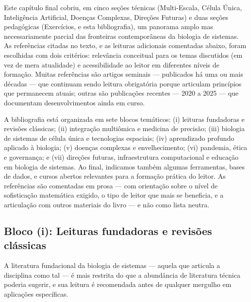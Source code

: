 {Este capítulo final cobriu, em cinco seções técnicas (Multi-Escala, Célula Única, Inteligência Artificial, Doenças Complexas, Direções Futuras) e duas seções pedagógicas (Exercícios, e esta bibliografia), um panorama amplo mas necessariamente parcial das fronteiras contemporâneas da biologia de sistemas. As referências citadas no texto, e as leituras adicionais comentadas abaixo, foram escolhidas com dois critérios: relevância conceitual para os temas discutidos (em vez de mera atualidade) e acessibilidade ao leitor em diferentes níveis de formação. Muitas referências são artigos seminais --- publicados há uma ou mais décadas --- que continuam sendo leitura obrigatória porque articulam princípios que permanecem atuais; outras são publicações recentes --- 2020 a 2025 --- que documentam desenvolvimentos ainda em curso.

A bibliografia está organizada em sete blocos temáticos: (i) leituras fundadoras e revisões clássicas; (ii) integração multiômica e medicina de precisão; (iii) biologia de sistemas de célula única e tecnologias espaciais; (iv) aprendizado profundo aplicado à biologia; (v) doenças complexas e envelhecimento; (vi) pandemia, ética e governança; e (vii) direções futuras, infraestrutura computacional e educação em biologia de sistemas. Ao final, indicamos também algumas ferramentas, bases de dados, e cursos abertos relevantes para a formação prática do leitor. As referências são comentadas em prosa --- com orientação sobre o nível de sofisticação matemática exigido, o tipo de leitor que mais se beneficia, e a articulação com outros materiais do livro --- e não como lista neutra.



\subsection*{Bloco (i): Leituras fundadoras e revisões clássicas}

A literatura fundacional da biologia de sistemas --- aquela que articula a disciplina como tal --- é mais restrita do que a abundância de literatura técnica poderia sugerir, e sua leitura é recomendada antes de qualquer mergulho em aplicações específicas.

}

